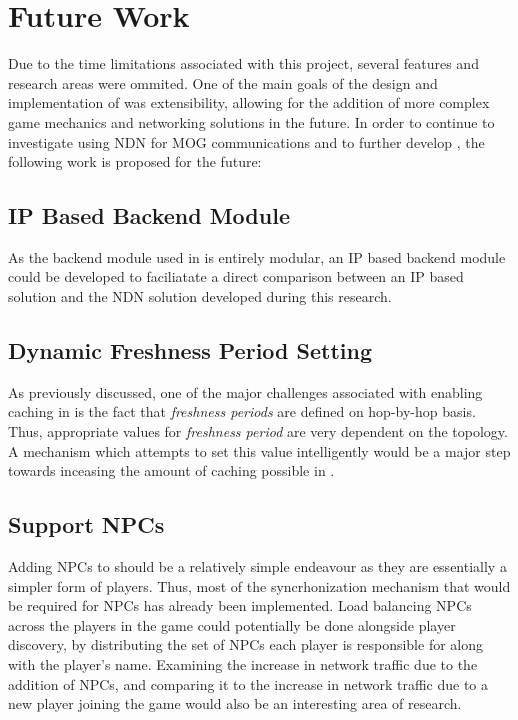 \section{Future Work}\label{sec:conc:fw}
Due to the time limitations associated with this project, several features and research areas were ommited. One of the main goals of the design and implementation of \game{} was extensibility, allowing for the addition of more complex game mechanics and networking solutions in the future. In order to continue to investigate using NDN for MOG communications and to further develop \game{}, the following work is proposed for the future:

\subsection{IP Based Backend Module}
As the backend module used in \game{} is entirely modular, an IP based backend module could be developed to faciliatate a direct comparison between an IP based solution and the NDN solution developed during this research.

\subsection{Dynamic Freshness Period Setting}
As previously discussed, one of the major challenges associated with enabling caching in \game{} is the fact that \textit{freshness periods} are defined on hop-by-hop basis. Thus, appropriate values for \textit{freshness period} are very dependent on the topology. A mechanism which attempts to set this value intelligently would be a major step towards inceasing the amount of caching possible in \game{}.

\subsection{Support NPCs}
Adding NPCs to \game{} should be a relatively simple endeavour as they are essentially a simpler form of players. Thus, most of the syncrhonization mechanism that would be required for NPCs has already been implemented. Load balancing NPCs across the players in the game could potentially be done alongside player discovery, by distributing the set of NPCs each player is responsible for along with the player's name. Examining the increase in network traffic due to the addition of NPCs, and comparing it to the increase in network traffic due to a new player joining the game would also be an interesting area of research.

